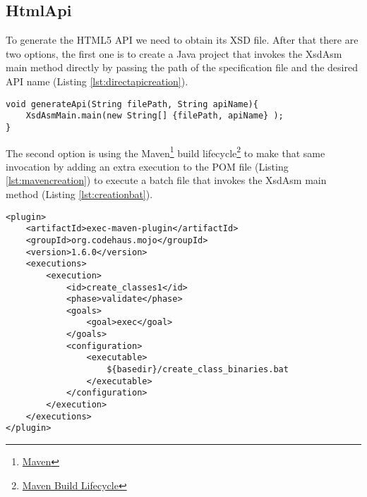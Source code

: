 \subsection{HtmlApi}

To generate the \ac{HTML}5 \ac{API} we need to obtain its \ac{XSD} file. After that there are two options, the first one is to create a Java project that invokes the XsdAsm main method directly by passing the path of the specification file and the desired \ac{API} name (Listing \ref{lst:directapicreation}).

\bigskip


\begin{minipage}{\linewidth}
\begin{lstlisting}[caption={API creation},label={lst:directapicreation}]
void generateApi(String filePath, String apiName){
    XsdAsmMain.main(new String[] {filePath, apiName} );    
}
\end{lstlisting}
\end{minipage}

\noindent
The second option is using the Maven\footnote{\href{https://maven.apache.org/}{Maven}} build lifecycle\footnote{\href{https://maven.apache.org/guides/introduction/introduction-to-the-lifecycle.html\#Build_Lifecycle_Basics}{Maven Build Lifecycle}} to make that same invocation by adding an extra execution to the \ac{POM} file (Listing \ref{lst:mavencreation}) to execute a batch file that invokes the XsdAsm main method (Listing \ref{lst:creationbat}). 

\bigskip


\begin{minipage}{\linewidth}
\begin{lstlisting}[caption={Maven API compile classes plugin},label={lst:mavencreation}]
<plugin>
    <artifactId>exec-maven-plugin</artifactId>
    <groupId>org.codehaus.mojo</groupId>
    <version>1.6.0</version>
    <executions>
        <execution>
            <id>create_classes1</id>
            <phase>validate</phase>
            <goals>
                <goal>exec</goal>
            </goals>
            <configuration>
                <executable>
                    ${basedir}/create_class_binaries.bat
                </executable>
            </configuration>
        </execution>
    </executions>
</plugin>
\end{lstlisting}
\end{minipage}

